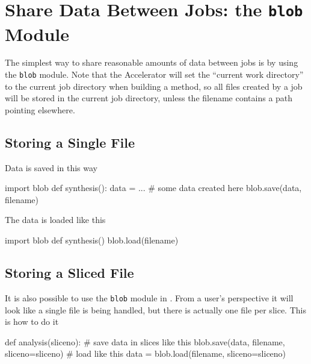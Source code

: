 \clearpage
\section{Share Data Between Jobs:  the \texttt{blob} Module}

The simplest way to share reasonable amounts of data between jobs is
by using the \texttt{blob} module.  Note that the Accelerator will set
the ``current work directory'' to the current job directory when
building a method, so all files created by a job will be stored in the
current job directory, unless the filename contains a path pointing
elsewhere.

\subsection*{Storing a  Single File}
Data is saved in this way
\begin{python}
import blob
def synthesis():
    data = ...  # some data created here
    blob.save(data, filename)
\end{python}
The data is loaded like this
\begin{python}
import blob
def synthesis()
    blob.load(filename)
\end{python}

\subsection*{Storing a Sliced File}
It is also possible to use the \texttt{blob} module in \analysis.
From a user's perspective it will look like a single file is being
handled, but there is actually one file per slice.  This is how to do
it
\begin{python}
def analysis(sliceno):
    # save data in slices like this
    blob.save(data, filename, sliceno=sliceno)
    # load like this
    data = blob.load(filename, sliceno=sliceno)
\end{python}

